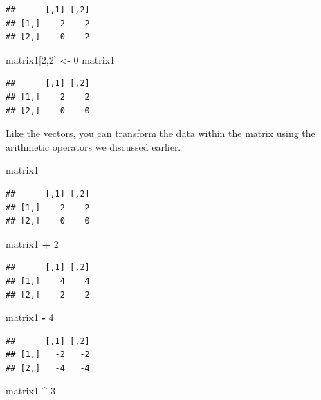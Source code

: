 \documentclass[
]{book}
\newenvironment{Shaded}{\begin{snugshade}}{\end{snugshade}}
\newcommand{\DecValTok}[1]{\textcolor[rgb]{0.00,0.00,0.81}{#1}}
\newcommand{\NormalTok}[1]{#1}
\newcommand{\OperatorTok}[1]{\textcolor[rgb]{0.81,0.36,0.00}{\textbf{#1}}}
\newcommand{\StringTok}[1]{\textcolor[rgb]{0.31,0.60,0.02}{#1}}
\begin{document}
\begin{verbatim}
##      [,1] [,2]
## [1,]    2    2
## [2,]    0    2
\end{verbatim}

\begin{Shaded}
\begin{Highlighting}[]
\NormalTok{matrix1[}\DecValTok{2}\NormalTok{,}\DecValTok{2}\NormalTok{] <-}\StringTok{ }\DecValTok{0}
\NormalTok{matrix1}
\end{Highlighting}
\end{Shaded}

\begin{verbatim}
##      [,1] [,2]
## [1,]    2    2
## [2,]    0    0
\end{verbatim}

Like the vectors, you can transform the data within the matrix using the arithmetic operators we discussed earlier.

\begin{Shaded}
\begin{Highlighting}[]
\NormalTok{matrix1}
\end{Highlighting}
\end{Shaded}

\begin{verbatim}
##      [,1] [,2]
## [1,]    2    2
## [2,]    0    0
\end{verbatim}

\begin{Shaded}
\begin{Highlighting}[]
\NormalTok{matrix1 }\OperatorTok{+}\StringTok{ }\DecValTok{2}
\end{Highlighting}
\end{Shaded}

\begin{verbatim}
##      [,1] [,2]
## [1,]    4    4
## [2,]    2    2
\end{verbatim}

\begin{Shaded}
\begin{Highlighting}[]
\NormalTok{matrix1 }\OperatorTok{-}\StringTok{ }\DecValTok{4}
\end{Highlighting}
\end{Shaded}

\begin{verbatim}
##      [,1] [,2]
## [1,]   -2   -2
## [2,]   -4   -4
\end{verbatim}

\begin{Shaded}
\begin{Highlighting}[]
\NormalTok{matrix1 }\OperatorTok{^}\StringTok{ }\DecValTok{3}
\end{Highlighting}
\end{Shaded}
\end{document}

